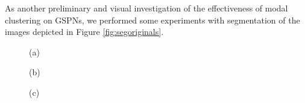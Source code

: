 As another preliminary and visual investigation of the effectiveness of modal clustering on GSPNs, we performed some experiments with segmentation of the images depicted in Figure \ref{fig:segoriginals}.

\begin{figure}
  \centering

  \begin{minipage}{0.5\textwidth}
    \centering


    (a)
  \end{minipage}\begin{minipage}{0.5\textwidth}
    \centering


    (b)
  \end{minipage}

  \vspace{0.5em}

  \begin{minipage}{0.5\textwidth}
    \centering


    (c)
  \end{minipage}\begin{minipage}{0.5\textwidth}
    \centering


\end{minipage}
\end{figure}
